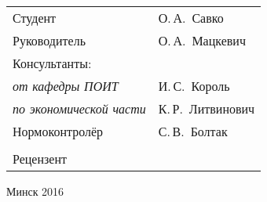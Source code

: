 \begin{titlepage}
\begin{center}
    \begin{tabular}{ p{}p{} }
      Студент & О.\,А.~Савко \\
      Руководитель & О.\,А.~Мацкевич \\
      Консультанты: &\\
      \hspace*{3ex}\emph{от кафедры ПОИТ} & И.\,С.~Король \\
      \hspace*{3ex}\emph{по экономической части} & К.\,Р.~Литвинович \\
      Нормоконтролёр & С.\,В.~Болтак \\
      & \\
      Рецензент &
    \end{tabular}

    \vfill
    {\normalsize Минск 2016}
  \end{center}
\end{titlepage}
